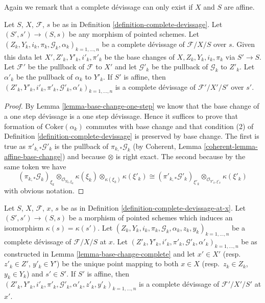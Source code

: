 \noindent
Again we remark that a complete d\'evissage can only exist if $X$ and
$S$ are affine.

\begin{lemma}
\label{lemma-base-change-complete}
Let $S$, $X$, $\mathcal{F}$, $s$ be as in
Definition \ref{definition-complete-devissage}.
Let $(S', s') \to (S, s)$ be any morphism of pointed schemes.
Let $(Z_k, Y_k, i_k, \pi_k, \mathcal{G}_k, \alpha_k)_{k = 1, \ldots, n}$
be a complete d\'evissage of $\mathcal{F}/X/S$ over $s$.
Given this data let $X', Z'_k, Y'_k, i'_k, \pi'_k$ be the base
changes of $X, Z_k, Y_k, i_k, \pi_k$ via $S' \to S$.
Let $\mathcal{F}'$ be the pullback of $\mathcal{F}$ to $X'$
and let $\mathcal{G}'_k$ be the pullback of $\mathcal{G}_k$ to $Z'_k$.
Let $\alpha'_k$ be the pullback of $\alpha_k$ to $Y'_k$.
If $S'$ is affine, then
$(Z'_k, Y'_k, i'_k, \pi'_k, \mathcal{G}'_k, \alpha'_k)_{k = 1, \ldots, n}$
is a complete d\'evissage of $\mathcal{F}'/X'/S'$ over $s'$.
\end{lemma}

\begin{proof}
By
Lemma \ref{lemma-base-change-one-step}
we know that the base change of a one step d\'evissage is a one step
d\'evissage. Hence it suffices to prove that formation of
$\text{Coker}(\alpha_k)$ commutes with base change and that
condition (2) of
Definition \ref{definition-complete-devissage}
is preserved by base change. The first is true as
$\pi'_{k, *}\mathcal{G}'_k$ is the pullback of
$\pi_{k, *}\mathcal{G}_k$ (by
Coherent, Lemma \ref{coherent-lemma-affine-base-change})
and because $\otimes$ is right exact. The second because
by the same token we have
$$
(\pi_{k, *}\mathcal{G}_k)_{\xi_k}
\otimes_{\mathcal{O}_{Y_k, \xi_k}} \kappa(\xi_k)
\otimes_{\kappa(\xi_k)} \kappa(\xi'_k)
\cong
(\pi'_{k, *}\mathcal{G}'_k)_{\xi'_k}
\otimes_{\mathcal{O}_{Y'_k, \xi'_k}} \kappa(\xi'_k)
$$
with obvious notation.
\end{proof}

\begin{lemma}
\label{lemma-base-change-complete-at-x}
Let $S$, $X$, $\mathcal{F}$, $x$, $s$ be as in
Definition \ref{definition-complete-devissage-at-x}.
Let $(S', s') \to (S, s)$ be a morphism of pointed schemes
which induces an isomorphism $\kappa(s) = \kappa(s')$. Let
$(Z_k, Y_k, i_k, \pi_k, \mathcal{G}_k, \alpha_k, z_k, y_k)_{k = 1, \ldots, n}$
be a complete d\'evissage of $\mathcal{F}/X/S$ at $x$.
Let
$(Z'_k, Y'_k, i'_k, \pi'_k, \mathcal{G}'_k, \alpha'_k)_{k = 1, \ldots, n}$
be as constructed in
Lemma \ref{lemma-base-change-complete}
and let $x' \in X'$ (resp.\ $z'_k \in Z'$, $y'_k \in Y'$) be the
unique point mapping to both $x \in X$ (resp.\ $z_k \in Z_k$, $y_k \in Y_k$)
and $s' \in S'$.
If $S'$ is affine, then
$(Z'_k, Y'_k, i'_k, \pi'_k, \mathcal{G}'_k, \alpha'_k,
z'_k, y'_k)_{k = 1, \ldots, n}$
is a complete d\'evissage of $\mathcal{F}'/X'/S'$ at $x'$.
\end{lemma}

